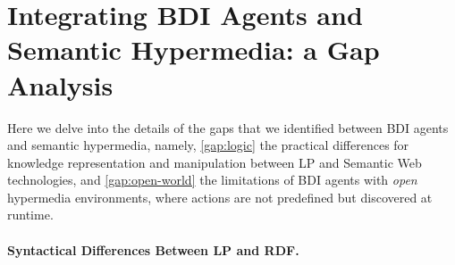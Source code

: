 \documentclass[
]{ceurart}
\begin{document}
\section{Integrating \acs{BDI} Agents and Semantic Hypermedia: a Gap Analysis}
\label{sec:gap-analysis}


Here we delve into the details of the gaps that we identified between \ac{BDI} agents and semantic hypermedia,
namely,
\ref{gap:logic} the practical differences for knowledge representation and manipulation 
between \ac{LP} and Semantic Web technologies,
and 
\ref{gap:open-world} the limitations of \ac{BDI} agents with \emph{open} hypermedia environments,
where actions are not predefined but discovered at runtime.

\paragraph{Syntactical Differences Between \acs{LP} and \acs{RDF}.}
\end{document}
